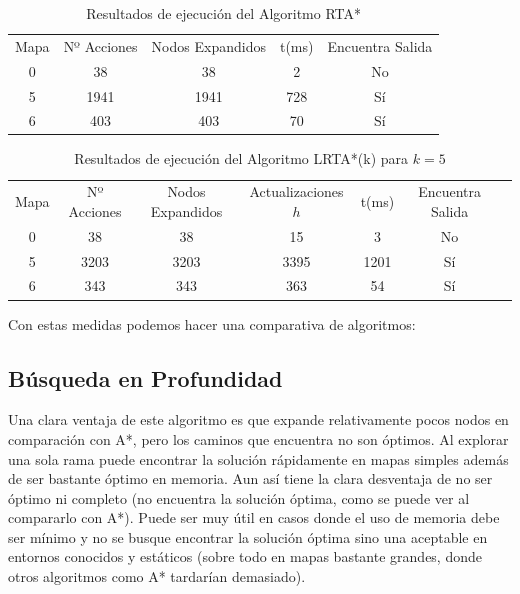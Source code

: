 \documentclass[11pt]{article}
\begin{document}
\begin{table}[H]
    \centering
    \label{tab:metricas_resultados_RTAStar}
    \begin{tabular}{| c | c | c | c | c |}
        \hline
        \rowcolor{Violet} \color{white} Mapa & \color{white} Nº Acciones & \color{white} Nodos Expandidos  & \color{white} t(ms) & \color{white} Encuentra Salida\\
        0 & 38 & 38 & 2 & No \\
        5 & 1941 & 1941 & 728 & Sí \\
        6 & 403 & 403 & 70 & Sí \\
        \hline
    \end{tabular}%
    \caption{Resultados de ejecución del Algoritmo RTA*}
\end{table}

\begin{table}[H]
    \centering
    \label{tab:metricas_resultados_LRTAStarK}
    \begin{tabular}{| c | c | c | c | c | c | c |}
        \hline
        \rowcolor{Violet} \color{white} Mapa & \color{white} Nº Acciones & \color{white} Nodos Expandidos & \color{white} Actualizaciones $h$ & \color{white} t(ms)& \color{white} Encuentra Salida\\
        0 & 38 & 38 & 15 & 3 & No\\
        5 & 3203 & 3203 & 3395 & 1201 & Sí \\
        6 & 343 & 343 & 363 & 54 & Sí \\
        \hline
    \end{tabular}%
    \caption{Resultados de ejecución del Algoritmo LRTA*(k) para $k=5$}
\end{table}

Con estas medidas podemos hacer una comparativa de algoritmos:
\subsection{Búsqueda en Profundidad}
Una clara ventaja de este algoritmo es que expande relativamente pocos nodos en comparación con A*, pero los caminos que encuentra no son óptimos. Al explorar una sola rama puede encontrar la solución rápidamente en mapas simples además de ser bastante óptimo en memoria. Aun así tiene la clara desventaja de no ser óptimo ni completo (no encuentra la solución óptima, como se puede ver al compararlo con A*). Puede ser muy útil en casos donde el uso de memoria debe ser mínimo y no se busque encontrar la solución óptima sino una aceptable en entornos conocidos y estáticos (sobre todo en mapas bastante grandes, donde otros algoritmos como A* tardarían demasiado).
\end{document}
